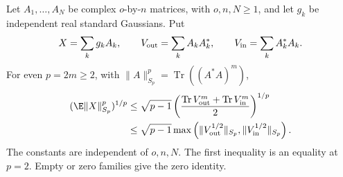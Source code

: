 \begin{proposition}\label{P:finite-gaussian-matrix}
  Let $A_1,\ldots,A_N$ be complex $o$-by-$n$ matrices, with $o,n,N \ge 1$,
  and let $g_k$ be independent real standard Gaussians. Put
  \[
    X=\sum_k g_kA_k,\qquad V_{\rm out}=\sum_k A_kA_k^*,
    \qquad V_{\rm in}=\sum_k A_k^*A_k.
  \]
  For even $p=2m \ge 2$, with $\|A\|_{S_p}^p=\operatorname{Tr}((A^*A)^m)$,
  \begin{align}
    (\E\|X\|_{S_p}^p)^{1/p}
    &\le \sqrt{p-1}\left(
    \frac{\operatorname{Tr}V_{\rm out}^m+
    \operatorname{Tr}V_{\rm in}^m}{2}\right)^{1/p}
    \label{E:finite-gaussian-average}\\
    &\le \sqrt{p-1}\max\left(
    \|V_{\rm out}^{1/2}\|_{S_p},\|V_{\rm in}^{1/2}\|_{S_p}\right).
    \label{E:finite-gaussian-maximum}
  \end{align}
  The constants are independent of $o,n,N$. The first inequality is an
  equality at $p=2$. Empty or zero families give the zero identity.
\end{proposition}

